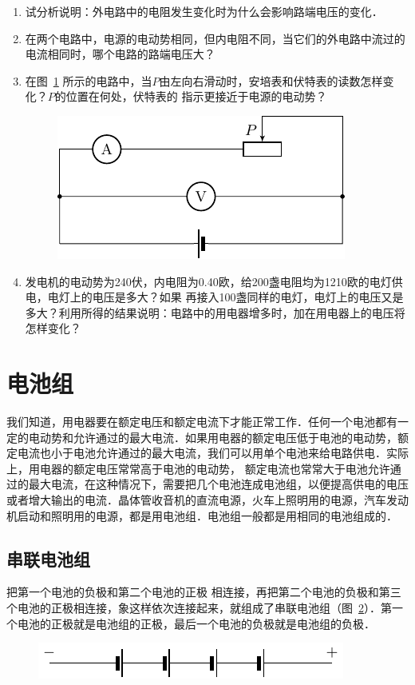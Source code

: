 \begin{enumerate}
    \item 试分析说明：外电路中的电阻发生变化时为什么会影响路端电压的变化．
    \item 在两个电路中，电源的电动势相同，但内电阻不同，当它们的外电路中流过的电流相同时，哪个电路的路端电压大？
    \item 在图~\ref{fig_B_7-32} 所示的电路中，当$P$由左向右滑动时，安培表和伏特表的读数怎样变化？$P$的位置在何处，伏特表的
指示更接近于电源的电动势？

\begin{figure}[htbp]
    \centering
    \includegraphics{fig/B/7-32.pdf}
    \caption{}\label{fig_B_7-32}
\end{figure}

\item 发电机的电动势为240伏，内电阻为0.40欧，给200盏电阻均为1210欧的电灯供电，电灯上的电压是多大？如果
再接入100盏同样的电灯，电灯上的电压又是多大？利用所得的结果说明：电路中的用电器增多时，加在用电器上的电压将
怎样变化？
\end{enumerate}


\section{电池组}
我们知道，用电器要在额定电压和额定电流下才能正常工作．任何一个电池都有一定的电动势和允许通过的最大电流．如果用电器的额定电压低于电池的电动势，额定电流也小于电池允许通过的最大电流，我们可以用单个电池来给电路供电．实际上，用电器的额定电压常常高于电池的电动势，
额定电流也常常大于电池允许通过的最大电流，在这种情况下，需要把几个电池连成电池组，以便提高供电的电压或者增大输出的电流．晶体管收音机的直流电源，火车上照明用的电源，汽车发动机启动和照明用的电源，都是用电池组．电池组一般都是用相同的电池组成的．

\subsection{串联电池组}

把第一个电池的负极和第二个电池的正极
相连接，再把第二个电池的负极和第三个电池的正极相连接，象这样依次连接起来，就组成了串联电池组（图~\ref{fig_B_7-33}）．第一个电池的正极就是电池组的正极，最后一个电池的负极就是电池组的负极．
\begin{figure}[htbp]
    \centering
    \includegraphics{fig/B/7-33.pdf}
    \caption{}\label{fig_B_7-33}
\end{figure}

